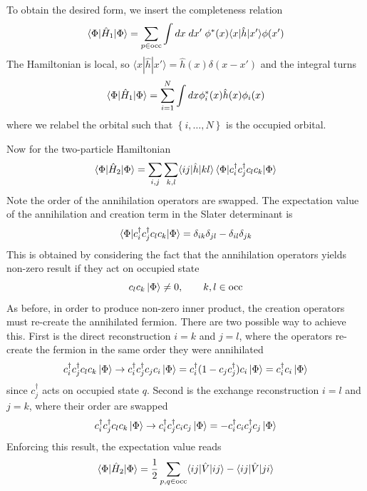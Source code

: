 \documentclass[../../../main.tex]{subfiles}
\begin{document}
To obtain the desired form, we insert the completeness relation
\begin{equation*}
  \braket{\Phi  | \hat{H}_1|\Phi}
  = \sum_{p \in \text{occ}}    \int dx\;dx'\;\phi^*(x)\langle x | \hat{h} | x' \rangle\phi(x')
\end{equation*}
The Hamiltonian is local, so $\langle x | \hat{h} | x' \rangle = \hat{h}(x)\delta(x-x')$ and the integral turns
\begin{equation*}
  \braket{\Phi  | \hat{H}_1|\Phi}
  = \sum_{i=1}^N \int dx\phi_i^*(x)\hat h(x)\phi_i(x)
\end{equation*}
where we relabel the orbital such that $\left\{ i,\dots,N \right\} $ is the occupied orbital.

Now for the two-particle Hamiltonian
\begin{equation*}
  \braket{\Phi  | \hat{H}_2|\Phi} = \sum_{i,j}\sum_{k,l}   \langle ij|\hat{h}|kl \rangle \braket{\Phi  | c_i^\dagger c ^\dagger_j c_l c_k|\Phi}
\end{equation*}
Note the order of the annihilation operators are swapped.
The expectation value of the annihilation and creation term in the Slater determinant is
\begin{equation*}
  \braket{\Phi  | c ^\dagger_i c ^\dagger_j c _l c_k|\Phi }=\delta_{ik }\delta_{jl } -\delta_{il }\delta_{jk }
\end{equation*}
This is obtained by considering the fact that the annihilation operators yields non-zero result if they act on occupied state
\begin{equation*}
  c_l c_k \ket{\Phi} \neq 0,
  \qquad k,l \in \text{occ}
\end{equation*}
As before, in order to produce non-zero inner product, the creation operators must re-create the annihilated fermion.
There are two possible way to achieve this.
First is the direct reconstruction $i=k$ and $j=l$, where the operators re-create the fermion in the same order they were annihilated
\begin{equation*}
  c_i^\dagger c ^\dagger_j c_l c_k \ket{\Phi}
  \to c_i^\dagger c ^\dagger_j c_j c_i \ket{\Phi}
  =c_i^\dagger (1-c_jc ^\dagger_j ) c_i \ket{\Phi}
  = c ^\dagger_i c_i \ket{\Phi}
\end{equation*}
since $c ^\dagger_j$ acts on occupied state $q$.
Second is the exchange reconstruction $i=l$ and $j=k$, where their order are swapped
\begin{equation*}
  c_i^\dagger c ^\dagger_j c_l c_k \ket{\Phi}
  \to c_i^\dagger c ^\dagger_j c_i c_j \ket{\Phi}
  = -c_i^\dagger c_i c ^\dagger_j c_j  \ket{\Phi}
\end{equation*}
Enforcing this result, the expectation value reads
\begin{equation*}
  \braket{\Phi  | \hat{H}_2|\Phi} =
  \frac{1 }{2}\sum_{p,q\in \text{occ}}   \langle ij|\hat{V}|ij \rangle -\langle ij|\hat{V}|ji \rangle
\end{equation*}
\end{document}
